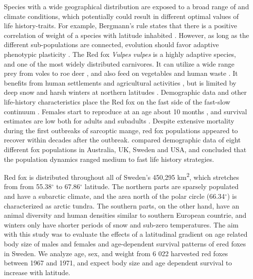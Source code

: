 \documentclass[PCJ,Unicode,screen]{cedram}
\begin{document}
Species with a wide geographical distribution are exposed to a broad range of  and climate conditions, which potentially could result in different optimal values of life history-traits. For example, Bergmann's rule states that there is a positive correlation of weight of a species with latitude inhabited \citep{blanckenhornEvolutionBodySize2000}. However, as long as the different sub-populations are connected, evolution should favor adaptive phenotypic plasticity \citep{mcnamaraStatedependentLifeHistories1996,kaweckiEvolutionLifeHistories1993}. The Red fox \emph{Vulpes vulpes} is a highly adaptive species, and one of the most widely distributed carnivores. It can utilize a wide range prey from voles to roe deer \citep{englund1970some,kjellanderCyclicVolesPrey2003}, and also feed on vegetables and human waste \citep{carvalho2001food,}. It benefits from human settlements and agricultural activities \citep{jahrenImpactHumanLand2020,gallantDisentanglingRelativeInfluences2020,vuorisaloUrbanRedFoxes2014}, but is limited by deep snow and harsh winters at northern latitudes \citep{bartonWinterSeverityLimits2007,frafjord1998red}. Demographic data and other life-history characteristics place the Red fox on the fast side of the fast-slow continuum \citep{heppellLifeHistoriesElasticity2000}. Females start to reproduce at an age about 10 months \citep{englund1970some}, and survival estimates are low both for adults and subadults \citep{devenish-nelsonDemographyCarnivoreRed2013, willebrandDecliningSurvivalRates2022}. Despite extensive mortality during the first outbreaks of sarcoptic mange, red fox populations appeared to recover within decades after the outbreak\citep{soulsbury2007impact,willebrandDecliningSurvivalRates2022}. \citet{devenish-nelsonDemographyCarnivoreRed2013} compared demographic data of eight different fox populations in Australia, UK, Sweden and USA, and concluded that the population dynamics ranged medium to fast life history strategies.

Red fox is distributed throughout all of Sweden's 450,295 km\textsuperscript{2}, which stretches from  from 55.38$^{\circ}$ to 67.86$^{\circ}$ latitude.  The northern parts are sparsely populated and have a subarctic climate, and the area north of the polar circle (66.34$^{\circ}$) is characterized as arctic tundra. The southern parts, on the other hand, have an animal  diversity and human densities similar to southern European countrie, and winters only have shorter periods of snow and sub-zero temperatures. The aim with this study was to evaluate the effects of a latitudinal gradient on age related body size of males and females and age-dependent survival patterns of ered foxes in Sweden. We analyze age, sex, and weight from 6 022 harvested red foxes between 1967 and 1971, and expect body size and age dependent survival to increase with latitude.
\end{document}
